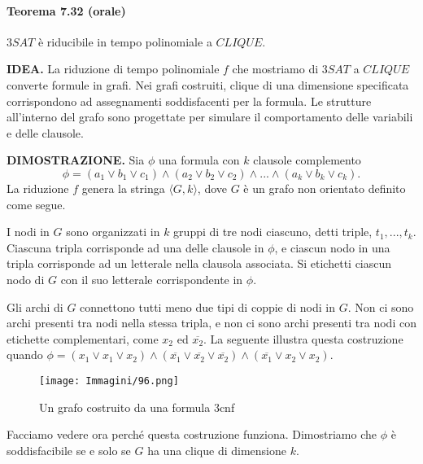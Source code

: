 \documentclass{article}
\begin{document}
\paragraph{Teorema 7.32 (orale)}
\label{teorema-7.32}
\vspace{1em}
\text{}
\newline
$3SAT$ è riducibile in tempo polinomiale a $CLIQUE$.

\text{}
\newline
\textbf{IDEA.}
La riduzione di tempo polinomiale $f$ che mostriamo di $3SAT$ a $CLIQUE$ converte formule in grafi. 
Nei grafi costruiti, clique di una dimensione specificata corrispondono ad assegnamenti soddisfacenti per la formula. 
Le strutture all'interno del grafo sono progettate per simulare il comportamento delle variabili e delle clausole.

\text{}
\newline
\textbf{DIMOSTRAZIONE.}
Sia $\phi$ una formula con $k$ clausole complemento
$$
\phi = (a_1 \lor b_1 \lor c_1) \land (a_2 \lor b_2 \lor c_2) \land ... \land (a_k \lor b_k \lor c_k).
$$
La riduzione $f$ genera la stringa $\langle G, k \rangle$, dove $G$ è un grafo non orientato definito come segue.

I nodi in $G$ sono organizzati in $k$ gruppi di tre nodi ciascuno, detti triple, $t_1,..., t_k$. 
Ciascuna tripla corrisponde ad una delle clausole in $\phi$, e ciascun nodo in una tripla corrisponde ad un letterale nella clausola associata. 
Si etichetti ciascun nodo di $G$ con il suo letterale corrispondente in $\phi$.

Gli archi di $G$ connettono tutti meno due tipi di coppie di nodi in $G$. 
Non
ci sono archi presenti tra nodi nella stessa tripla, e non ci sono archi presenti
tra nodi con etichette complementari, come $x_2$ ed $\overline{x_2}$. 
La seguente illustra questa costruzione quando $\phi = (x_1 \lor x_1 \lor x_2) \land (\overline{x_1} \lor \overline{x_2} \lor \overline{x_2}) \land (\overline{x_1} \lor x_2 \lor x_2)$.
\begin{figure}[H]
    \centering
    \texttt{[image: Immagini/96.png]}
    \caption{Un grafo costruito da una formula 3cnf}
    \label{fig:3cnf}
\end{figure}
Facciamo vedere ora perché questa costruzione funziona. 
Dimostriamo che $\phi$ è soddisfacibile se e solo se $G$ ha una clique di dimensione $k$.
\end{document}
